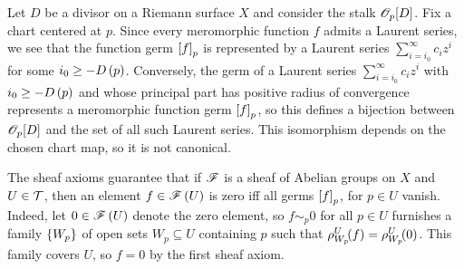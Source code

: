 \documentclass[../Moduli_Spaces_of_Riemann_Surfaces.tex]{subfiles}
\begin{document}
    \vspace{-0.05in}
    \begin{example}
        Let $D$ be a divisor on a Riemann surface $X$ and consider the stalk $\mathscr{O}_p\!\left[D\right]$. Fix a chart centered at $p$. Since every meromorphic function $f$ admits a Laurent series, we see that the function germ $\left[f\right]_p$ is represented by a Laurent series $\sum_{i=i_0}^{\infty}c_iz^i$ for some $i_0\geq-D\left(p\right)$. Conversely, the germ of a Laurent series $\sum_{i=i_0}^{\infty}c_iz^i$ with $i_0\geq-D\left(p\right)$ and whose principal part has positive radius of convergence represents a meromorphic function germ $\left[f\right]_p$, so this defines a bijection between $\mathscr{O}_p\!\left[D\right]$ and the set of all such Laurent series. This isomorphism depends on the chosen chart map, so it is not canonical.\exqed
    \end{example}
    \begin{remark}
        The sheaf axioms guarantee that if $\mathscr{F}$ is a sheaf of Abelian groups on $X$ and $U\in\mathcal{T}$, then an element $f\in\mathscr{F}\left(U\right)$ is zero iff all germs $\left[f\right]_p$, for $p\in U$ vanish. Indeed, let $0\in\mathscr{F}\left(U\right)$ denote the zero element, so $f\sim_p0$ for all $p\in U$ furnishes a family $\left\{W_p\right\}$ of open sets $W_p\subseteq U$ containing $p$ such that $\rho^U_{W_p}\!\!\left(f\right)=\rho^U_{W_p}\!\!\left(0\right)$. This family covers $U$, so $f=0$ by the first sheaf axiom.\exqed
    \end{remark}
\end{document}
